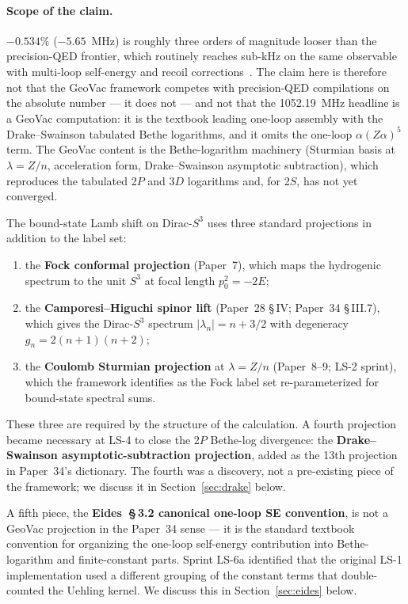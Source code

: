 \documentclass[11pt]{article}
\begin{document}
\paragraph*{Scope of the claim.}
$-0.534\%$ ($-5.65$~MHz) is roughly three orders of magnitude looser
than the precision-QED frontier, which routinely reaches sub-kHz on
the same observable with multi-loop self-energy and recoil
corrections~\cite{eides2001, yerokhin2024_two_loop_se}. The claim
here is therefore not that the GeoVac framework competes with
precision-QED compilations on the absolute number --- it does not
--- and not that the 1052.19~MHz headline is a GeoVac computation:
it is the textbook leading one-loop assembly with the Drake--Swainson
tabulated Bethe logarithms, and it omits the one-loop
$\alpha(Z\alpha)^5$ term.  The GeoVac content is the Bethe-logarithm
machinery (Sturmian basis at $\lambda = Z/n$, acceleration form,
Drake--Swainson asymptotic subtraction), which reproduces the tabulated
2$P$ and 3$D$ logarithms and, for 2$S$, has not yet converged.

The bound-state Lamb shift on Dirac-$S^3$ uses three standard
projections in addition to the label set:

\begin{enumerate}
\setlength\itemsep{0pt}
\item the \textbf{Fock conformal projection} (Paper~7), which maps the
hydrogenic spectrum to the unit $S^3$ at focal length $p_0^2 = -2E$;
\item the \textbf{Camporesi--Higuchi spinor lift} (Paper~28
\S\,IV; Paper~34 \S\,III.7), which gives the Dirac-$S^3$ spectrum
$|\lambda_n| = n + 3/2$ with degeneracy $g_n = 2(n+1)(n+2)$;
\item the \textbf{Coulomb Sturmian projection} at $\lambda = Z/n$
(Paper~8--9; LS-2 sprint), which the framework identifies as the
Fock label set re-parameterized for bound-state spectral sums.
\end{enumerate}

These three are required by the structure of the calculation.  A
fourth projection became necessary at LS-4 to close the 2$P$ Bethe-log
divergence: the \textbf{Drake--Swainson asymptotic-subtraction
projection}, added as the 13th projection in Paper~34's
dictionary.  The fourth was a discovery, not a pre-existing piece of
the framework; we discuss it in Section~\ref{sec:drake} below.

A fifth piece, the \textbf{Eides~\S\,3.2 canonical one-loop SE
convention}, is not a GeoVac projection in the Paper~34 sense --- it
is the standard textbook convention for organizing the one-loop
self-energy contribution into Bethe-logarithm and finite-constant
parts.  Sprint LS-6a identified that the original LS-1 implementation
used a different grouping of the constant terms that double-counted
the Uehling kernel.  We discuss this in Section~\ref{sec:eides}
below.
\end{document}

